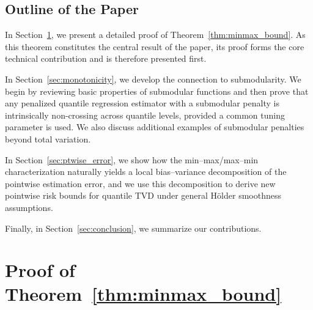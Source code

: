 \documentclass[11pt]{article}
\theoremstyle{plain}
\theoremstyle{definition}
\theoremstyle{remark}
\begin{document}
\subsection{Outline of the Paper}
In Section~\ref{sec:minmax}, we present a detailed proof of Theorem~\ref{thm:minmax_bound}. As this theorem constitutes the central result of the paper, its proof forms the core technical contribution and is therefore presented first. 

In Section~\ref{sec:monotonicity}, we develop the connection to submodularity. We begin by reviewing basic properties of submodular functions and then prove that any penalized quantile regression estimator with a submodular penalty is intrinsically non-crossing across quantile levels, provided a common tuning parameter is used. We also discuss additional examples of submodular penalties beyond total variation.

In Section~\ref{sec:ptwise_error}, we show how the min--max/max--min characterization naturally yields a local bias--variance decomposition of the pointwise estimation error, and we use this decomposition to derive new pointwise risk bounds for quantile TVD under general H\"older smoothness assumptions.

Finally, in Section~\ref{sec:conclusion}, we summarize our contributions.





\section{Proof of Theorem~\ref{thm:minmax_bound}}\label{sec:minmax}
\end{document}
